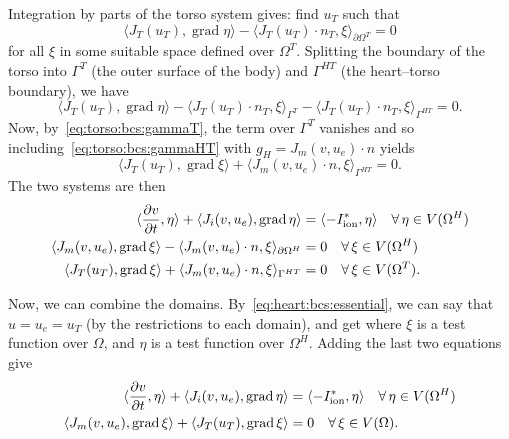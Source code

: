 \documentclass[a4paper, reqno]{amsart}
\DeclareMathOperator{\Grad}{grad}
\newcommand{\foralls}{\forall \,}
\newcommand{\inner}[2]{\langle #1, #2 \rangle}
\newcommand{\ddt}[1]{\frac{\partial #1}{\partial t}}
\numberwithin{equation}{section}
\newcommand{\heart}{\Omega^H}
\newcommand{\torso}{\Omega^T}
\begin{document}
Integration by parts of the torso system gives: find $u_T$ such that
\begin{equation}
  \inner{J_T(u_T)}{\Grad \eta} - \inner{J_T(u_T) \cdot n_T}{\xi}_{\partial \torso}
  = 0
\end{equation}
for all $\xi$ in some suitable space defined over $\torso$.
Splitting the boundary of the torso into $\Gamma^T$ (the outer surface
of the body) and $\Gamma^{HT}$ (the heart--torso boundary), we have
\begin{equation}
  \inner{J_T(u_T)}{\Grad \eta}
  - \inner{J_T(u_T) \cdot n_T}{\xi}_{\Gamma^T}
  - \inner{J_T(u_T) \cdot n_T}{\xi}_{\Gamma^{HT}}
  = 0 .
\end{equation}
Now, by~\eqref{eq:torso:bcs:gammaT}, the term over $\Gamma^T$ vanishes
and so including~\eqref{eq:torso:bcs:gammaHT} with $g_H = J_m(v, u_e)
\cdot n$ yields
\begin{equation}
  \inner{J_T(u_T)}{\Grad \xi}
  + \inner{J_m(v, u_e) \cdot n}{\xi}_{\Gamma^{HT}}
  = 0 .
\end{equation}
The two systems are then
\begin{align}
  \inner{\ddt{v}}{\eta}
  + \inner{J_i(v, u_e)}{\Grad \eta}
  &= \inner{- I^\ast_{\rm{ion}}}{\eta} \quad \foralls \eta \in V(\heart) \\
  \inner{J_m(v, u_e)}{\Grad \xi}
  - \inner{J_m(v, u_e) \cdot n}{\xi}_{\partial \heart}
  &= 0 \quad \foralls \xi \in V(\heart) \\
  \inner{J_T(u_T)}{\Grad \xi}
  + \inner{J_m(v, u_e) \cdot n}{\xi}_{\Gamma^{HT}}
  &= 0 \quad \foralls \xi \in V(\torso).
\end{align}

Now, we can combine the domains. By~\eqref{eq:heart:bcs:essential}, we
can say that $u = u_e = u_T$ (by the restrictions to each domain), and
get where $\xi$ is a test function over $\Omega$, and $\eta$ is a test
function over $\heart$. Adding the last two equations give
\begin{align}
  \inner{\ddt{v}}{\eta}
  + \inner{J_i(v, u_e)}{\Grad \eta}
  &= \inner{- I^\ast_{\rm{ion}}}{\eta} \quad \foralls \eta \in V(\heart) \\
  \inner{J_m(v, u_e)}{\Grad \xi}
  + \inner{J_T(u_T)}{\Grad \xi}
  &= 0 \quad \foralls \xi \in V(\Omega).
\end{align}




\end{document}
